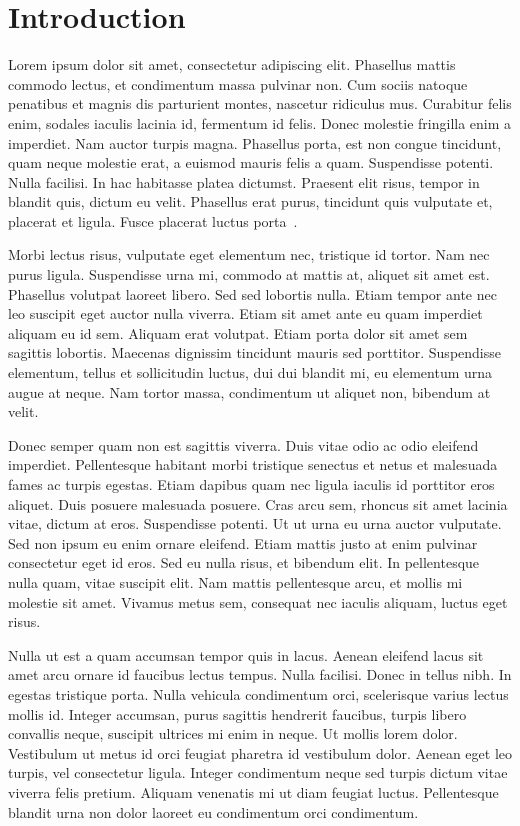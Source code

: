 \chapter{Introduction}
Lorem ipsum dolor sit amet, consectetur adipiscing elit.
Phasellus mattis commodo lectus, et condimentum massa pulvinar non.
Cum sociis natoque penatibus et magnis dis parturient montes, nascetur ridiculus mus.
Curabitur felis enim, sodales iaculis lacinia id, fermentum id felis.
Donec molestie fringilla enim a imperdiet.
Nam auctor turpis magna.
Phasellus porta, est non congue tincidunt, quam neque molestie erat, a euismod mauris felis a quam.
Suspendisse potenti.
Nulla facilisi.
In hac habitasse platea dictumst.
Praesent elit risus, tempor in blandit quis, dictum eu velit.
Phasellus erat purus, tincidunt quis vulputate et, placerat et ligula.
Fusce placerat luctus porta~\cite{dey2001conceptual}.

Morbi lectus risus, vulputate eget elementum nec, tristique id tortor.
Nam nec purus ligula.
Suspendisse urna mi, commodo at mattis at, aliquet sit amet est.
Phasellus volutpat laoreet libero.
Sed sed lobortis nulla.
Etiam tempor ante nec leo suscipit eget auctor nulla viverra.
Etiam sit amet ante eu quam imperdiet aliquam eu id sem.
Aliquam erat volutpat.
Etiam porta dolor sit amet sem sagittis lobortis.
Maecenas dignissim tincidunt mauris sed porttitor.
Suspendisse elementum, tellus et sollicitudin luctus, dui dui blandit mi, eu elementum urna augue at neque.
Nam tortor massa, condimentum ut aliquet non, bibendum at velit.

Donec semper quam non est sagittis viverra.
Duis vitae odio ac odio eleifend imperdiet.
Pellentesque habitant morbi tristique senectus et netus et malesuada fames ac turpis egestas.
Etiam dapibus quam nec ligula iaculis id porttitor eros aliquet.
Duis posuere malesuada posuere.
Cras arcu sem, rhoncus sit amet lacinia vitae, dictum at eros.
Suspendisse potenti.
Ut ut urna eu urna auctor vulputate.
Sed non ipsum eu enim ornare eleifend.
Etiam mattis justo at enim pulvinar consectetur eget id eros.
Sed eu nulla risus, et bibendum elit.
In pellentesque nulla quam, vitae suscipit elit.
Nam mattis pellentesque arcu, et mollis mi molestie sit amet.
Vivamus metus sem, consequat nec iaculis aliquam, luctus eget risus.

Nulla ut est a quam accumsan tempor quis in lacus.
Aenean eleifend lacus sit amet arcu ornare id faucibus lectus tempus.
Nulla facilisi.
Donec in tellus nibh.
In egestas tristique porta.
Nulla vehicula condimentum orci, scelerisque varius lectus mollis id.
Integer accumsan, purus sagittis hendrerit faucibus, turpis libero convallis neque, suscipit ultrices mi enim in neque.
Ut mollis lorem dolor.
Vestibulum ut metus id orci feugiat pharetra id vestibulum dolor.
Aenean eget leo turpis, vel consectetur ligula.
Integer condimentum neque sed turpis dictum vitae viverra felis pretium.
Aliquam venenatis mi ut diam feugiat luctus.
Pellentesque blandit urna non dolor laoreet eu condimentum orci condimentum.


